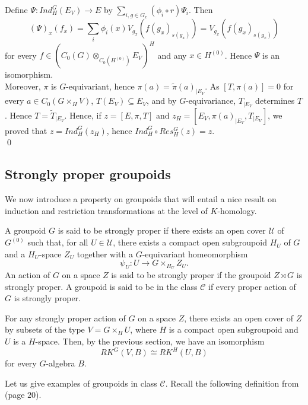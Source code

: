 \begin{dem}
Define $\Psi : Ind_H^G (E_V)\rightarrow E$ by $\sum_{i,g\in G_x}(\phi_i\circ r) \Psi_i$. Then 
\[(\Psi)_x(f_x) =  \sum_{i}\phi_i(x)V_{g_x}(f(g_x)_{s(g_x)}) = V_{g_x}(f(g_x)_{s(g_x)})  \]
for every $f\in \left( C_0( G)\otimes_{C_0(H^{(0)})} E_V\right)^H$ and any $x\in H^{(0)}$.  Hence $\Psi$ is an isomorphism.\\ 

Moreover, $\pi$ is $G$-equivariant, hence $\pi(a) = \tilde\pi(a)_{|E_V}$. As $[T,\pi(a)]=0$ for every $a\in C_0(G\times_H V)$, $T(E_V)\subseteq E_V$, and by $G$-equivariance, $T_{|E_V}$ determines $T$. Hence $T= \tilde T_{|E_V}$. Hence, if $z=[E,\pi,T]$ and $z_H =[E_V,\pi(a)_{|E_V},T_{|E_V}]$, we proved that $z = Ind_H^G( z_H)$, hence $Ind_H^G \circ Res_H^G (z)= z$.\\
\qed  
\end{dem}

\subsection{Strongly proper groupoids}

We now introduce a property on groupoids that will entail a nice result on induction and restriction transformations at the level of $K$-homology.

\begin{definition}\label{StronglyProper}
A groupoid $G$ is said to be strongly proper if there exists an open cover $\mathcal U$ of $G^{(0)}$ such that, for all $U\in\mathcal U$, there exists a compact open subgroupoid $H_U$ of $G$ and a $H_U$-space $Z_U$ together with a $G$-equivariant homeomorphism
\[\psi_U : U \rightarrow G\times_{H_U} Z_U.\] 
An action of $G$ on a space $Z$ is said to be strongly proper if the groupoid $Z\rtimes G$ is strongly proper. A groupoid is said to be in the class $\mathcal C$ if every proper action of $G$ is strongly proper.
\end{definition}

\begin{rk}
For any strongly proper action of $G$ on a space $Z$, there exists an open cover of $Z$ by subsets of the type $V=G\times_H U$, where $H$ is a compact open subgroupoid and $U$ is a $H$-space. Then, by the previous section, we have an isomorphism
\[RK^G(V,B)\cong RK^H(U,B)\]
for every $G$-algebra $B$. 
\end{rk}

Let us give examples of groupoids in class $\mathcal C$. Recall the following definition from \cite{Renault} (page $20$).

